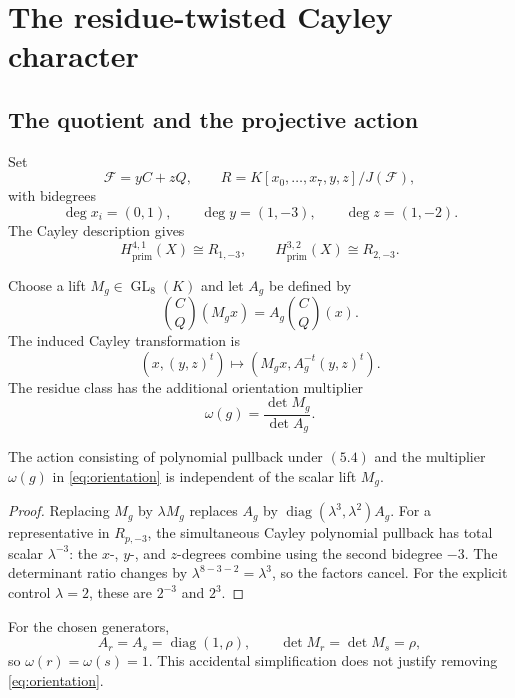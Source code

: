 \section{The residue-twisted Cayley character}

\subsection{The quotient and the projective action}

Set
\[
 \mathcal F=yC+zQ,\qquad
 R=K[x_0,\ldots,x_7,y,z]/J(\mathcal F),
\]
with bidegrees
\[
 \deg x_i=(0,1),\qquad
 \deg y=(1,-3),\qquad
 \deg z=(1,-2).                                    \tag{5.1}
\]
The Cayley description \cite[\S5.4, equation~(8)]{FIK2012} gives
\[
 H^{4,1}_{\mathrm{prim}}(X)\cong R_{1,-3},
 \qquad
 H^{3,2}_{\mathrm{prim}}(X)\cong R_{2,-3}.         \tag{5.2}
\]

Choose a lift \(M_g\in\operatorname{GL}_8(K)\) and let \(A_g\) be
defined by
\[
 \binom C Q(M_gx)=A_g\binom C Q(x).                \tag{5.3}
\]
The induced Cayley transformation is
\[
 (x,(y,z)^t)\longmapsto
 (M_gx,A_g^{-t}(y,z)^t).                           \tag{5.4}
\]
The residue class has the additional orientation multiplier
\begin{equation}
\label{eq:orientation}
 \omega(g)=\frac{\det M_g}{\det A_g}.
\end{equation}

\begin{lemma}
\label{lem:lift}
The action consisting of polynomial pullback under \((5.4)\) and the
multiplier \(\omega(g)\) in \eqref{eq:orientation} is independent of
the scalar lift \(M_g\).
\end{lemma}

\begin{proof}
Replacing \(M_g\) by \(\lambda M_g\) replaces \(A_g\) by
\(\operatorname{diag}(\lambda^3,\lambda^2)A_g\).
For a representative in \(R_{p,-3}\), the simultaneous Cayley
polynomial pullback has total scalar \(\lambda^{-3}\): the \(x\)-,
\(y\)-, and \(z\)-degrees combine using the second bidegree \(-3\).
The determinant ratio changes by
\(\lambda^{8-3-2}=\lambda^3\), so the factors cancel.  For the explicit
control \(\lambda=2\), these are \(2^{-3}\) and \(2^3\).
\end{proof}

For the chosen generators,
\[
 A_r=A_s=\operatorname{diag}(1,\rho),\qquad
 \det M_r=\det M_s=\rho,
\]
so \(\omega(r)=\omega(s)=1\).  This accidental simplification does not
justify removing \eqref{eq:orientation}.

